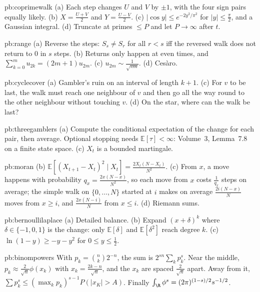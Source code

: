 \begin{hint}{pb:coprimewalk}
(a) Each step changes $U$ and $V$ by $\pm1$, with the four sign pairs equally likely. (b) $X=\frac{U+V}2$ and $Y=\frac{U-V}2$. (c) $|\cos y|\le e^{-2y^2/\pi^2}$ for $|y|\le\frac\pi2$, and
a Gaussian integral. (d) Truncate at primes $\le P$ and let $P\to\infty$ after $t$.
\end{hint}

\begin{hint}{pb:range}
(a) Reverse the steps: $S_s\ne S_r$ for all $r<s$ iff the reversed walk does not return to $0$ in $s$ steps. (b) Returns only happen at even times, and
$\sum_{k=0}^mu_{2k}=(2m+1)u_{2m}$. (c) $u_{2m}\sim\frac1{\sqrt{\pi m}}$. (d) Cesàro.
\end{hint}

\begin{hint}{pb:cyclecover}
(a) Gambler's ruin on an interval of length $k+1$. (c) For $v$ to be last, the walk must reach one neighbour of $v$ and then go all the way round
to the other neighbour without touching $v$. (d) On the star, where can the walk be last?
\end{hint}

\begin{hint}{pb:threegamblers}
(a) Compute the conditional expectation of the change for each pair, then average. Optional stopping needs $\mathbb E[\tau]<\infty$: Volume~3, Lemma~7.8 on a finite
state space. (c) $X_t$ is a bounded martingale.
\end{hint}

\begin{hint}{pb:moran}
(b) $\mathbb E[(X_{t+1}-X_t)^2\mid X_t]=\frac{2X_t(N-X_t)}{N^2}$. (c) From $x$, a move happens with probability $q_x=\frac{2x(N-x)}{N^2}$, so each move from $x$ costs $\frac1{q_x}$ steps on
average; the simple walk on $\{0,\dots,N\}$ started at $i$ makes on average $\frac{2i(N-x)}N$ moves from $x\ge i$, and $\frac{2x(N-i)}N$ from $x\le i$. (d) Riemann sums.
\end{hint}

\begin{hint}{pb:bernoullilaplace}
(a) Detailed balance. (b) Expand $(x+\delta)^k$ where $\delta\in\{-1,0,1\}$ is the change: only $\mathbb E[\delta]$ and $\mathbb E[\delta^2]$ reach degree $k$. (c) $\ln(1-y)\ge-y-y^2$ for $0\le y\le\frac12$.
\end{hint}

\begin{hint}{pb:binompowers}
With $p_k=\binom nk2^{-n}$, the sum is $2^{sn}\sum_kp_k^s$. Near the middle, $p_k\approx\frac2{\sqrt n}\phi(x_k)$ with $x_k=\frac{2k-n}{\sqrt n}$, and the $x_k$ are spaced $\frac2{\sqrt n}$ apart.
Away from it, $\sum p_k^s\le(\max_kp_k)^{s-1}P(|x_K|>A)$. Finally $\int_\R\phi^s=(2\pi)^{(1-s)/2}s^{-1/2}$.
\end{hint}


